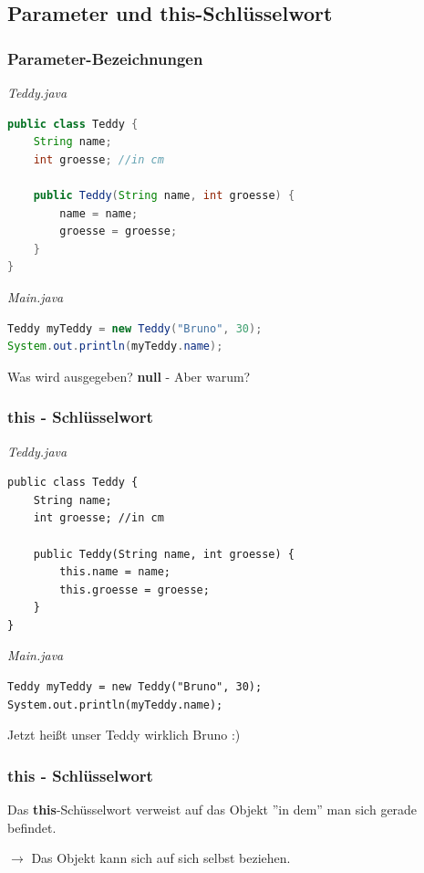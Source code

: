 \documentclass[18pt]{beamer}
\begin{document}

\subsection{Parameter und this-Schlüsselwort}
\begin{frame}[containsverbatim]
	\frametitle{Parameter-Bezeichnungen}
	
	\emph{Teddy.java}
	\begin{lstlisting}[language=java]
public class Teddy {
	String name;
	int groesse; //in cm

	public Teddy(String name, int groesse) {
		name = name;
		groesse = groesse;
	}
}
	\end{lstlisting}

	\emph{Main.java}
	\begin{lstlisting}[language=java]
Teddy myTeddy = new Teddy("Bruno", 30);
System.out.println(myTeddy.name);
	\end{lstlisting}
	
	Was wird ausgegeben?
	\pause
	\textbf{null} - Aber warum? %
\end{frame}


\begin{frame}[containsverbatim]
	\frametitle{this - Schlüsselwort}
	
	\emph{Teddy.java}
	\begin{lstlisting}
public class Teddy {
	String name;
	int groesse; //in cm
			
	public Teddy(String name, int groesse) {
		this.name = name;
		this.groesse = groesse;
	}
}
	\end{lstlisting}

	\emph{Main.java}
	\begin{lstlisting}
Teddy myTeddy = new Teddy("Bruno", 30);
System.out.println(myTeddy.name);
	\end{lstlisting}
	
	
	Jetzt heißt unser Teddy wirklich Bruno :)
\end{frame}


\begin{frame}
	\frametitle{this - Schlüsselwort}
	
	Das \textbf{this}-Schüsselwort verweist auf das Objekt ''in dem'' man sich gerade befindet.
	
	$\rightarrow$ Das Objekt kann sich auf sich selbst beziehen.
\end{frame}
\end{document}
